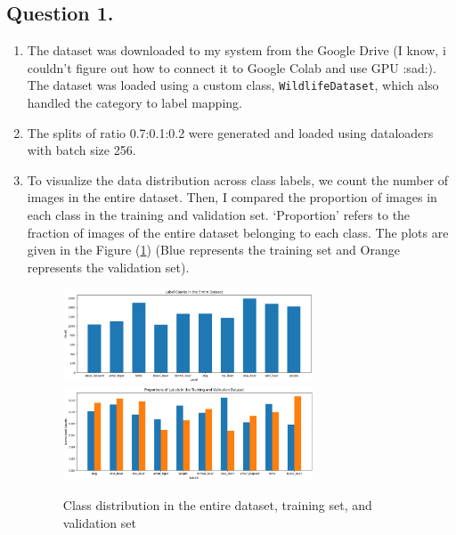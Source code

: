 \documentclass[10pt]{article}
\begin{document}
    \subsection*{\textbf{Question 1.}}
    \begin{enumerate}[label=(\alph*)]
        \item The dataset was downloaded to my system from the Google Drive (I know, i
        couldn't figure out how to connect it to Google Colab and use GPU :sad:). The
        dataset was loaded using a custom class, \texttt{WildlifeDataset},
        which also handled the category to label mapping.
        \item The splits of ratio 0.7:0.1:0.2 were generated and loaded using dataloaders
        with batch size 256.
        \item To visualize the data distribution across class labels, we count the number
        of images in the entire dataset. Then, I compared the proportion of images in each
        class in the training and validation set. `Proportion' refers to the fraction of
        images of the entire dataset belonging to each class. The plots are given in the
        Figure (\ref{fig:classification-data-distro}) (Blue represents the training set and
        Orange represents the validation set).
        \begin{figure}[h!]
            \centering
            \includegraphics[width=0.7\textwidth]{Assets/Classification/01}
            \includegraphics[width=0.7\textwidth]{Assets/Classification/02}
            \caption{Class distribution in the entire dataset, training set, and validation set}
            \label{fig:classification-data-distro}
        \end{figure}
    \end{enumerate}
\end{document}
